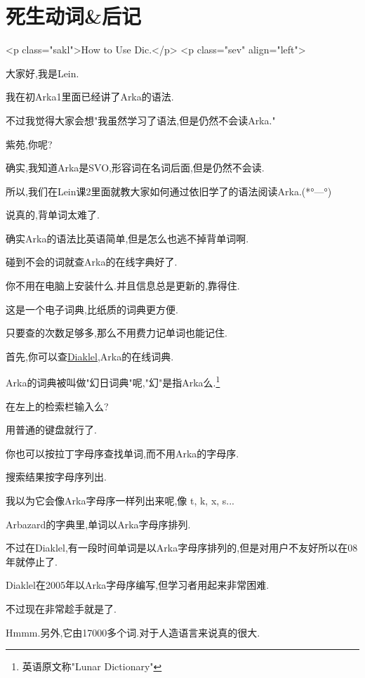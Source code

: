 \chapter{死生动词\&后记}
<p class="sakl">How to Use Dic.</p>
    <p class="sev" align="left">
    

大家好,我是Lein.

我在初Arka1里面已经讲了Arka的语法.

不过我觉得大家会想"我虽然学习了语法,但是仍然不会读Arka."

紫苑,你呢?


确实,我知道Arka是SVO,形容词在名词后面,但是仍然不会读.

所以,我们在Lein课2里面就教大家如何通过依旧学了的语法阅读Arka.(*°---°)


说真的,背单词太难了.

确实Arka的语法比英语简单,但是怎么也逃不掉背单词啊.


碰到不会的词就查Arka的在线字典好了.

你不用在电脑上安装什么.并且信息总是更新的,靠得住. 


这是一个电子词典,比纸质的词典更方便.

只要查的次数足够多,那么不用费力记单词也能记住.

首先,你可以查\href{http://conlinguistics.org/klel/}{Diaklel},Arka的在线词典.

Arka的词典被叫做"幻日词典"呢,"幻"是指Arka么.\footnote{英语原文称"Lunar Dictionary"}

在左上的检索栏输入么?


用普通的键盘就行了.

你也可以按拉丁字母序查找单词,而不用Arka的字母序.



搜索结果按字母序列出.

我以为它会像Arka字母序一样列出来呢,像 t, k, x, s...



Arbazard的字典里,单词以Arka字母序排列.

不过在Diaklel,有一段时间单词是以Arka字母序排列的,但是对用户不友好所以在08年就停止了.



Diaklel在2005年以Arka字母序编写,但学习者用起来非常困难.

不过现在非常趁手就是了.


Hmmm.另外,它由17000多个词.对于人造语言来说真的很大.

